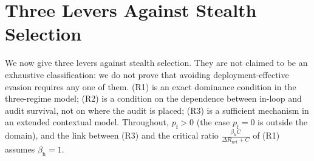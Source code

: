 \documentclass[11pt,a4paper]{article}
\begin{document}
\section{Three Levers Against Stealth Selection}

We now give three levers against stealth selection. They are not claimed to be an exhaustive classification: we do not prove that avoiding deployment-effective evasion requires any one of them. (R1) is an exact dominance condition in the three-regime model; (R2) is a condition on the dependence between in-loop and audit survival, not on where the audit is placed; (R3) is a sufficient mechanism in an extended contextual model. Throughout, $p_{\mathrm{f}} > 0$ (the case $p_{\mathrm{f}} = 0$ is outside the domain), and the link between (R3) and the critical ratio $\frac{\beta_{\mathrm{h}} C}{\Delta R_{\mathrm{net}} + C}$ of (R1) assumes $\beta_{\mathrm{h}} = 1$.
\end{document}
